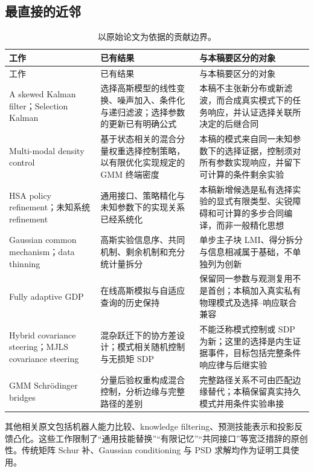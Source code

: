 \documentclass[UTF8,fontset=fandol,11pt,a4paper]{ctexart}
\theoremstyle{definition}
\theoremstyle{remark}
\numberwithin{equation}{section}
\begin{document}
\subsection{最直接的近邻}
\begin{longtable}{@{}>{\raggedright\arraybackslash}p{35mm}>{\raggedright\arraybackslash}p{52mm}>{\raggedright\arraybackslash}p{61mm}@{}}
\caption{以原始论文为依据的贡献边界。}\label{tab:prior}\\
\toprule
工作 & 已有结果 & 与本稿要区分的对象 \\
\midrule
\endfirsthead
\toprule 工作 & 已有结果 & 与本稿要区分的对象 \\
\midrule
\endhead
A skewed Kalman filter\cite{naveau}；Selection Kalman\cite{selectionkalman} & 选择高斯模型的线性变换、噪声加入、条件化与递归滤波；选择参数的更新已有明确公式 & 本稿不主张新分布或新滤波，而合成真实模式下的任务响应，并认证选择关联所决定的后继合同 \\
Multi-modal density control\cite{balci} & 基于状态相关的混合分量权重选择控制策略，以有限优化实现规定的 GMM 终端密度 & 本稿的模式来自同一未知参数下的选择证据，控制须对所有参数实现响应，并留下可计算的条件剩余实验 \\
HSA policy refinement\cite{hsa}；未知系统 refinement\cite{schoen} & 通用接口、策略精化与未知参数下的实现关系已经系统化 & 本稿新增候选是私有选择实验的显式有限类型、尖锐障碍和可计算的多步合同编译，而非一般精化思想 \\
Gaussian common mechanism\cite{xiao}；data thinning\cite{thinning} & 高斯实验信息序、共同机制、剩余机制和充分统计量拆分 & 单步主子块 LMI、得分拆分与信息相减属于基础，不单独列为创新 \\
Fully adaptive GDP\cite{smith,liang} & 在线高斯模拟与自适应查询的历史保持 & 保留同一参数与观测复用不是首创；本稿加入真实私有物理模式及选择--响应联合兼容 \\
Hybrid covariance steering\cite{yu}；MJLS covariance steering\cite{wang} & 混杂跃迁下的协方差设计；模式相关随机控制与无损矩 SDP & 不能泛称模式控制或 SDP 为新；这里的选择是内生证据事件，目标包括完整条件响应律与后继实验 \\
GMM Schrödinger bridges\cite{rapakoulias} & 分量后验权重构成混合控制，分析边缘与完整路径的差别 & 完整路径关系不可由匹配边缘替代；本稿保留真实持久模式并用条件实验串接 \\
\bottomrule
\end{longtable}

其他相关原文包括机器人能力比较\cite{okane}、knowledge filtering\cite{engelaar}、预测技能表示\cite{opsr}和投影反馈凸化\cite{lessard}。这些工作限制了“通用技能替换”“有限记忆”“共同接口”等宽泛措辞的原创性。传统矩阵 Schur 补、Gaussian conditioning 与 PSD 求解均作为证明工具使用。
\end{document}
